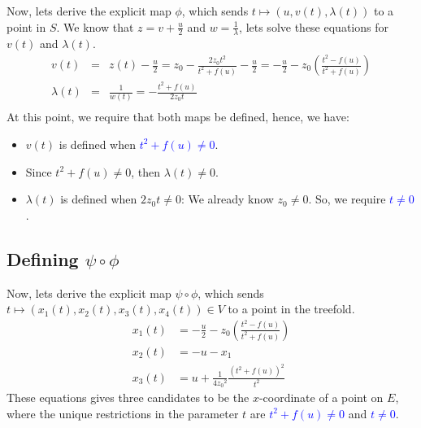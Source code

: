 \documentclass[letterpaper,11pt]{article}
\begin{document}
Now, lets derive the explicit map $\phi$, which sends $ t \mapsto (u,v(t),\lambda(t))$ to a point in $S$. We know that $z=v+\tfrac{u}{2}$ and $w= \tfrac{1}{\lambda}$, lets solve these equations for $v(t)$ and $\lambda(t)$.
\begin{eqnarray*}
 v(t) &=&  z(t)-\frac{u}{2} = z_0-\frac{2z_0t^2}{t^2+f(u)}-\frac{u}{2}
       =  -\frac{u}{2}-z_0\left(\frac{t^2-f(u)}{t^2+f(u)} \right) \\
\lambda(t) &=& \frac{1}{w(t)} = -\frac{t^2+f(u)}{2z_0t} \\
\end{eqnarray*}
At this point, we require that both maps be defined, hence, we have:
\begin{itemize}
 \item $v(t)$ is defined when \textcolor{blue}{$t^2+f(u)\neq 0 $}.
 \item Since $t^2+f(u)\neq 0 $, then $\lambda(t)\neq 0$.
 \item $\lambda(t)$ is defined when $2z_0t\neq 0 $: We already know $z_0\neq 0$. So, we require \textcolor{blue}{$t\neq 0$}.
\end{itemize}


\subsection{Defining $\psi\circ\phi$}
Now, lets derive the explicit map $\psi\circ\phi$, which sends $t\mapsto(x_1(t),x_2(t),x_3(t),x_4(t))\in V$ to a point in the treefold.
\begin{equation}
 \begin{aligned}
 x_1(t) &= -\frac{u}{2}-z_0\left(\frac{t^2-f(u)}{t^2+f(u)} \right) \\
 x_2(t) &= -u-x_1  \\
 x_3(t) &=  u +\frac{1}{4{z_0}^2} \frac{\left(t^2+f(u)\right)^2}{t^2} 
 \end{aligned}
\end{equation}
These equations gives three candidates to be the $x$-coordinate of a point on $E$, where the unique restrictions in the parameter $t$ are \textcolor{blue}{$t^2+f(u)\neq 0 $} and \textcolor{blue}{$t\neq 0 $}.
\end{document}
